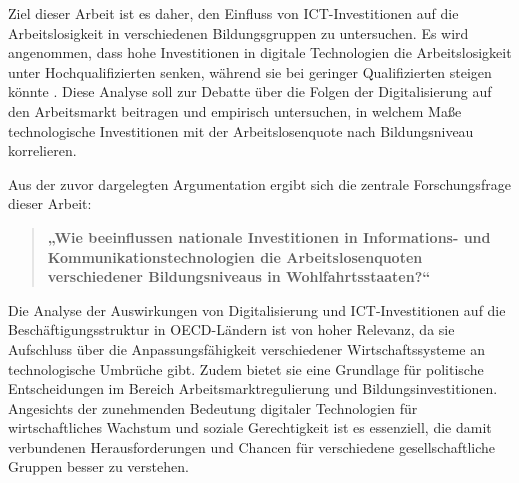 Ziel dieser Arbeit ist es daher, den Einfluss von \ac{ICT}-Investitionen auf die 
Arbeitslosigkeit in verschiedenen Bildungsgruppen zu untersuchen. Es wird angenommen, 
dass hohe Investitionen in digitale Technologien die Arbeitslosigkeit unter 
Hochqualifizierten senken, während sie bei geringer Qualifizierten steigen könnte 
\parencite[vgl.][S. 1045]{acemoglu2011skills}. Diese Analyse soll zur Debatte über die 
Folgen der Digitalisierung auf den Arbeitsmarkt beitragen und empirisch untersuchen, 
in welchem Maße technologische Investitionen mit der Arbeitslosenquote nach 
Bildungsniveau korrelieren.

Aus der zuvor dargelegten Argumentation ergibt sich die zentrale Forschungsfrage 
dieser Arbeit:

\begin{quote} \textbf{„Wie beeinflussen nationale Investitionen in Informations- und 
    Kommunikationstechnologien die Arbeitslosenquoten verschiedener Bildungsniveaus 
    in Wohlfahrtsstaaten?“} \end{quote}

Die Analyse der Auswirkungen von Digitalisierung und \ac{ICT}-Investitionen auf die 
Beschäftigungsstruktur in \ac{OECD}-Ländern ist von hoher Relevanz, da sie Aufschluss 
über die Anpassungsfähigkeit verschiedener Wirtschaftssysteme an technologische 
Umbrüche gibt. Zudem bietet sie eine Grundlage für politische Entscheidungen im 
Bereich Arbeitsmarktregulierung und Bildungsinvestitionen. Angesichts der zunehmenden 
Bedeutung digitaler Technologien für wirtschaftliches Wachstum und soziale 
Gerechtigkeit ist es essenziell, die damit verbundenen Herausforderungen und Chancen 
für verschiedene gesellschaftliche Gruppen besser zu verstehen.
